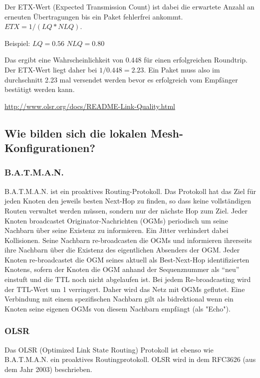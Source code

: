 \documentclass[a4paper,10pt]{article}
\begin{document}
Der ETX-Wert (Expected Transmission Count) ist dabei die erwartete Anzahl an erneuten Übertragungen bis ein Paket fehlerfrei ankommt.
$ETX= 1/(LQ*NLQ)$.

Beispiel:
$LQ=0.56$
$NLQ=0.80$

Das ergibt eine Wahrscheinlichkeit von $0.448$ für einen erfolgreichen Roundtrip.
Der ETX-Wert liegt daher bei $1/0.448=2.23$. Ein Paket muss also im durchschnitt 2.23 mal versendet werden
bevor es erfolgreich vom Empfänger bestätigt werden kann.

\url{http://www.olsr.org/docs/README-Link-Quality.html}

\subsection{Wie bilden sich die lokalen Mesh-Konfigurationen?}


\subsubsection*{B.A.T.M.A.N.}

B.A.T.M.A.N. ist ein proaktives Routing-Protokoll.
Das Protokoll hat das Ziel für jeden Knoten den jeweils besten Next-Hop zu finden, so dass keine vollständigen Routen verwaltet werden müssen, sondern nur der nächste Hop zum Ziel.
Jeder Knoten broadcastet Originator-Nachrichten (OGMs) periodisch um seine Nachbarn über seine Existenz zu informieren.
Ein Jitter verhindert dabei Kollisionen.
Seine Nachbarn re-broadcasten die OGMs und informieren ihrerseits ihre Nachbarn über die Existenz des eigentlichen Absenders der OGM.
Jeder Knoten re-broadcastet die OGM seines aktuell als Best-Next-Hop identifizierten Knotens, sofern der Knoten die OGM anhand der Sequenznummer als "`neu"' einstuft und die TTL noch nicht abgelaufen ist.
Bei jedem Re-broadcasting wird der TTL-Wert um 1 verringert.
Daher wird das Netz mit OGMs geflutet.
Eine Verbindung mit einem spezifischen Nachbarn gilt als bidrektional wenn ein Knoten seine eigenen OGMs von diesem Nachbarn empfängt (als "Echo").


\subsubsection*{OLSR}
Das OLSR (Optimized Link State Routing) Protokoll ist ebenso wie B.A.T.M.A.N. ein proaktives Routingprotokoll.
OLSR wird in dem RFC3626 (aus dem Jahr 2003) beschrieben.
\end{document}
